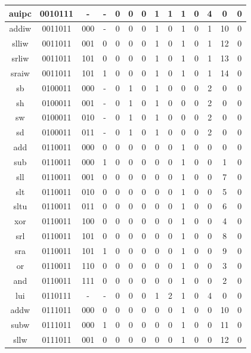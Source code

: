 \begin{longtable}{|c<{\raggedright}|c<{\raggedright}|c<{\raggedright}|c|c|c|c|c|c|c|c|c|c|c|}
\hline
auipc & 0010111 & - & - & 0 & 0 & 0 & 1 & 1 & 1 & 0 & 4 & 0 & 0 \\
\hline
addiw & 0011011 & 000 & - & 0 & 0 & 0 & 1 & 0 & 1 & 0 & 1 & 10 & 0 \\
\hline
slliw & 0011011 & 001 & 0 & 0 & 0 & 0 & 1 & 0 & 1 & 0 & 1 & 12 & 0 \\
\hline
srliw & 0011011 & 101 & 0 & 0 & 0 & 0 & 1 & 0 & 1 & 0 & 1 & 13 & 0 \\
\hline
sraiw & 0011011 & 101 & 1 & 0 & 0 & 0 & 1 & 0 & 1 & 0 & 1 & 14 & 0 \\
\hline
sb & 0100011 & 000 & - & 0 & 1 & 0 & 1 & 0 & 0 & 0 & 2 & 0 & 0 \\
\hline
sh & 0100011 & 001 & - & 0 & 1 & 0 & 1 & 0 & 0 & 0 & 2 & 0 & 0 \\
\hline
sw & 0100011 & 010 & - & 0 & 1 & 0 & 1 & 0 & 0 & 0 & 2 & 0 & 0 \\
\hline
sd & 0100011 & 011 & - & 0 & 1 & 0 & 1 & 0 & 0 & 0 & 2 & 0 & 0 \\
\hline
add & 0110011 & 000 & 0 & 0 & 0 & 0 & 0 & 0 & 1 & 0 & 0 & 0 & 0 \\
\hline
sub & 0110011 & 000 & 1 & 0 & 0 & 0 & 0 & 0 & 1 & 0 & 0 & 1 & 0 \\
\hline
sll & 0110011 & 001 & 0 & 0 & 0 & 0 & 0 & 0 & 1 & 0 & 0 & 7 & 0 \\
\hline
slt & 0110011 & 010 & 0 & 0 & 0 & 0 & 0 & 0 & 1 & 0 & 0 & 5 & 0 \\
\hline
sltu & 0110011 & 011 & 0 & 0 & 0 & 0 & 0 & 0 & 1 & 0 & 0 & 6 & 0 \\
\hline
xor & 0110011 & 100 & 0 & 0 & 0 & 0 & 0 & 0 & 1 & 0 & 0 & 4 & 0 \\
\hline
srl & 0110011 & 101 & 0 & 0 & 0 & 0 & 0 & 0 & 1 & 0 & 0 & 8 & 0 \\
\hline
sra & 0110011 & 101 & 1 & 0 & 0 & 0 & 0 & 0 & 1 & 0 & 0 & 9 & 0 \\
\hline
or & 0110011 & 110 & 0 & 0 & 0 & 0 & 0 & 0 & 1 & 0 & 0 & 3 & 0 \\
\hline
and & 0110011 & 111 & 0 & 0 & 0 & 0 & 0 & 0 & 1 & 0 & 0 & 2 & 0 \\
\hline
lui & 0110111 & - & - & 0 & 0 & 0 & 1 & 2 & 1 & 0 & 4 & 0 & 0 \\
\hline
addw & 0111011 & 000 & 0 & 0 & 0 & 0 & 0 & 0 & 1 & 0 & 0 & 10 & 0 \\
\hline
subw & 0111011 & 000 & 1 & 0 & 0 & 0 & 0 & 0 & 1 & 0 & 0 & 11 & 0 \\
\hline
sllw & 0111011 & 001 & 0 & 0 & 0 & 0 & 0 & 0 & 1 & 0 & 0 & 12 & 0 \\

\end{longtable}
